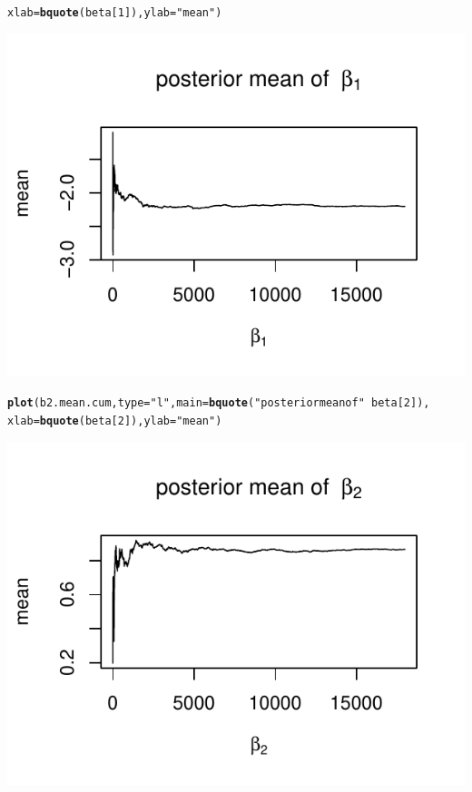 \documentclass[11pt,english]{article}\usepackage[]{graphicx}\usepackage[]{xcolor}
\makeatletter
\def\maxwidth{ %
  \ifdim\Gin@nat@width>\linewidth
    \linewidth
  \else
    \Gin@nat@width
  \fi
}
\newcommand{\hlnum}[1]{\textcolor[rgb]{0.686,0.059,0.569}{#1}}%
\newcommand{\hlstr}[1]{\textcolor[rgb]{0.192,0.494,0.8}{#1}}%
\newcommand{\hlopt}[1]{\textcolor[rgb]{0,0,0}{#1}}%
\newcommand{\hlstd}[1]{\textcolor[rgb]{0.345,0.345,0.345}{#1}}%
\newcommand{\hlkwc}[1]{\textcolor[rgb]{0.333,0.667,0.333}{#1}}%
\newcommand{\hlkwd}[1]{\textcolor[rgb]{0.737,0.353,0.396}{\textbf{#1}}}%
\newenvironment{kframe}{%
 \def\at@end@of@kframe{}%
 \ifinner\ifhmode%
  \def\at@end@of@kframe{\end{minipage}}%
  \begin{minipage}{\columnwidth}%
 \fi\fi%
 \def\FrameCommand##1{\hskip\@totalleftmargin \hskip-\fboxsep
 \colorbox{shadecolor}{##1}\hskip-\fboxsep
     \hskip-\linewidth \hskip-\@totalleftmargin \hskip\columnwidth}%
 \MakeFramed {\advance\hsize-\width
   \@totalleftmargin\z@ \linewidth\hsize
   \@setminipage}}%
 {\par\unskip\endMakeFramed%
 \at@end@of@kframe}
\newenvironment{knitrout}{}{} %
\makeatother
\begin{document}
\begin{center}
\begin{knitrout}
\begin{kframe}
\begin{alltt}
\hlkwc{xlab} \hlstd{=} \hlkwd{bquote}\hlstd{(beta[}\hlnum{1}\hlstd{]),}\hlkwc{ylab} \hlstd{=} \hlstr{"mean"}\hlstd{)}
\end{alltt}
\end{kframe}
\includegraphics[width=\maxwidth]{figure/unnamed-chunk-10-2} 
\begin{kframe}\begin{alltt}
\hlkwd{plot}\hlstd{(b2.mean.cum,}\hlkwc{type} \hlstd{=} \hlstr{"l"}\hlstd{,}\hlkwc{main} \hlstd{=} \hlkwd{bquote}\hlstd{(}\hlstr{"posterior mean of "} \hlopt{~} \hlstd{beta[}\hlnum{2}\hlstd{]),}
\hlkwc{xlab} \hlstd{=} \hlkwd{bquote}\hlstd{(beta[}\hlnum{2}\hlstd{]),}\hlkwc{ylab} \hlstd{=} \hlstr{"mean"}\hlstd{)}
\end{alltt}
\end{kframe}
\includegraphics[width=\maxwidth]{figure/unnamed-chunk-10-3} 
\end{knitrout}
\par\end{center}
\end{document}
